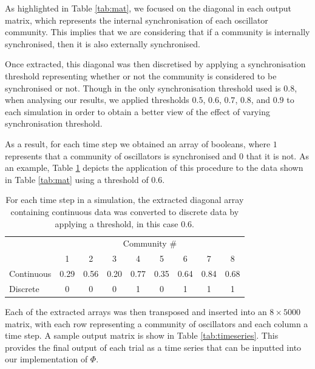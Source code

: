 \documentclass[a4paper,11pt]{article}
\begin{document}
As highlighted in Table \ref{tab:mat}, we focused on the diagonal in each output matrix, which represents the internal synchronisation of each oscillator community. This implies that we are considering that if a community is internally synchronised, then it is also externally synchronised.

Once extracted, this diagonal was then discretised by applying a synchronisation threshold representing whether or not the community is considered to be synchronised or not. Though in \cite{Shanahan2010} the only synchronisation threshold used is $0.8$, when analysing our results, we applied thresholds $0.5$, $0.6$, $0.7$, $0.8$, and $0.9$ to each simulation in order to obtain a better view of the effect of varying synchronisation threshold.

As a result, for each time step we obtained an array of booleans, where $1$ represents that a community of oscillators is synchronised and $0$ that it is not. As an example, Table \ref{tab:arr} depicts the application of this procedure to the data shown in Table \ref{tab:mat} using a threshold of $0.6$.

\begin{table}[H]
\centering
\begin{tabular}{l | c c c c c c c c}
& \multicolumn{8}{c}{Community \#} \\ [2mm]
& 1 & 2 & 3 & 4 & 5 & 6 & 7 & 8 \\
\hline
Continuous & 0.29 & 0.56 & 0.20 & 0.77 & 0.35 & 0.64 & 0.84 & 0.68 \\
Discrete & 0 & 0 & 0 & 1 & 0 & 1 & 1 & 1 \\
\end{tabular}
\caption{For each time step in a simulation, the extracted diagonal array containing continuous data was converted to discrete data by applying a threshold, in this case $0.6$. \label{tab:arr}}
\end{table}
 
Each of the extracted arrays was then transposed and inserted into an $8 \times 5000$ matrix, with each row representing a community of oscillators and each column a time step. A sample output matrix is show in Table \ref{tab:timeseries}. This provides the final output of each trial as a time series that can be inputted into our implementation of $\Phi$.
\end{document}
